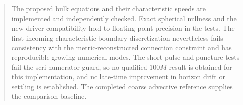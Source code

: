 \begin{abstract}The proposed bulk equations and their characteristic speeds are implemented and independently checked. Exact spherical nullness and the new driver compatibility hold to floating-point precision in the tests. The first incoming-characteristic boundary discretization nevertheless fails consistency with the metric-reconstructed connection constraint and has reproducible growing numerical modes. The short pulse and puncture tests fail the scri-numerator guard, so no qualified $100M$ result is obtained for this implementation, and no late-time improvement in horizon drift or settling is established. The completed coarse advective reference supplies the comparison baseline.\end{abstract}
